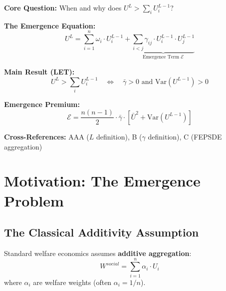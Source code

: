
\begin{tcolorbox}[colback=blue!5!white, colframe=blue!75!black,
    title=Quick Reference: Level Emergence Theorem]

\textbf{Core Question:} When and why does $U^L > \sum_i U^{L-1}_i$?

\textbf{The Emergence Equation:}
\begin{equation}
U^L = \sum_{i=1}^{n} \omega_i \cdot U^{L-1}_i + \underbrace{\sum_{i<j} \gamma_{ij} \cdot U^{L-1}_i \cdot U^{L-1}_j}_{\text{Emergence Term } \mathcal{E}}
\label{eq:let-aggregation}
\end{equation}

\textbf{Main Result (LET):}
\begin{equation}
\boxed{U^L > \sum_i U^{L-1}_i \quad \Longleftrightarrow \quad \bar{\gamma} > 0 \text{ and } \text{Var}(U^{L-1}) > 0}
\end{equation}

\textbf{Emergence Premium:}
\begin{equation}
\mathcal{E} = \frac{n(n-1)}{2} \cdot \bar{\gamma} \cdot \left[ \bar{U}^2 + \text{Var}(U^{L-1}) \right]
\end{equation}

\textbf{Cross-References:} AAA ($L$ definition), B ($\gamma$ definition), C (FEPSDE aggregation)
\end{tcolorbox}


\section{Motivation: The Emergence Problem}
\label{sec:let-motivation}

\subsection{The Classical Additivity Assumption}

Standard welfare economics assumes \textbf{additive aggregation}:
\begin{equation}
W^{social} = \sum_{i=1}^{n} \alpha_i \cdot U_i
\label{eq:additive-welfare}
\end{equation}
where $\alpha_i$ are welfare weights (often $\alpha_i = 1/n$).

